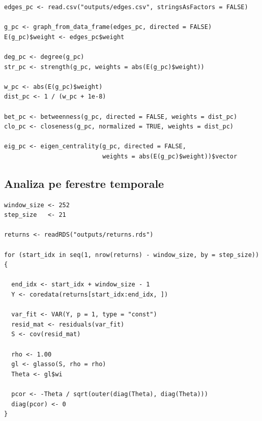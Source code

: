 \begin{verbatim}
edges_pc <- read.csv("outputs/edges.csv", stringsAsFactors = FALSE)

g_pc <- graph_from_data_frame(edges_pc, directed = FALSE)
E(g_pc)$weight <- edges_pc$weight

deg_pc <- degree(g_pc)
str_pc <- strength(g_pc, weights = abs(E(g_pc)$weight))

w_pc <- abs(E(g_pc)$weight)
dist_pc <- 1 / (w_pc + 1e-8)

bet_pc <- betweenness(g_pc, directed = FALSE, weights = dist_pc)
clo_pc <- closeness(g_pc, normalized = TRUE, weights = dist_pc)

eig_pc <- eigen_centrality(g_pc, directed = FALSE,
                           weights = abs(E(g_pc)$weight))$vector
\end{verbatim}

\subsection{Analiza pe ferestre temporale}

\begin{verbatim}
window_size <- 252
step_size   <- 21

returns <- readRDS("outputs/returns.rds")

for (start_idx in seq(1, nrow(returns) - window_size, by = step_size)) {

  end_idx <- start_idx + window_size - 1
  Y <- coredata(returns[start_idx:end_idx, ])

  var_fit <- VAR(Y, p = 1, type = "const")
  resid_mat <- residuals(var_fit)
  S <- cov(resid_mat)

  rho <- 1.00
  gl <- glasso(S, rho = rho)
  Theta <- gl$wi

  pcor <- -Theta / sqrt(outer(diag(Theta), diag(Theta)))
  diag(pcor) <- 0
}
\end{verbatim}